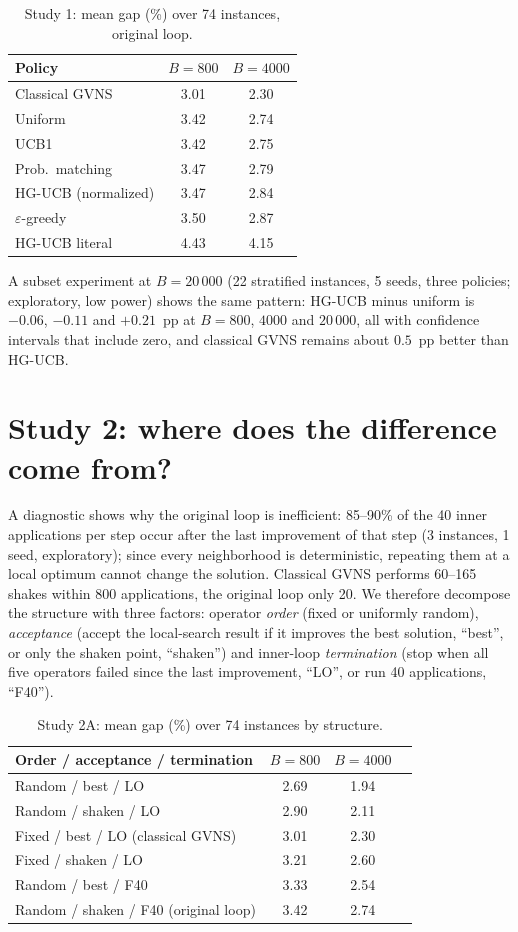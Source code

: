 \documentclass[conference]{IEEEtran}
\begin{document}
\begin{table}[t]
\caption{Study 1: mean gap (\%) over 74 instances, original loop.}\label{tab:s1}
\centering
\begin{tabular}{lcc}
\toprule
Policy & $B=800$ & $B=4000$ \\
\midrule
Classical GVNS & 3.01 & 2.30 \\
Uniform & 3.42 & 2.74 \\
UCB1 & 3.42 & 2.75 \\
Prob.\ matching & 3.47 & 2.79 \\
HG-UCB (normalized) & 3.47 & 2.84 \\
$\varepsilon$-greedy & 3.50 & 2.87 \\
HG-UCB literal & 4.43 & 4.15 \\
\bottomrule
\end{tabular}
\end{table}

A subset experiment at $B=20\,000$ (22 stratified instances, 5 seeds, three policies; exploratory, low power) shows the same pattern: HG-UCB minus uniform is $-0.06$, $-0.11$ and $+0.21$~pp at $B=800$, $4000$ and $20\,000$, all with confidence intervals that include zero, and classical GVNS remains about $0.5$~pp better than HG-UCB.

\section{Study 2: where does the difference come from?}
A diagnostic shows why the original loop is inefficient: 85--90\% of the 40 inner applications per step occur after the last improvement of that step (3 instances, 1 seed, exploratory); since every neighborhood is deterministic, repeating them at a local optimum cannot change the solution. Classical GVNS performs 60--165 shakes within 800 applications, the original loop only 20. We therefore decompose the structure with three factors: operator \emph{order} (fixed or uniformly random), \emph{acceptance} (accept the local-search result if it improves the best solution, ``best'', or only the shaken point, ``shaken'') and inner-loop \emph{termination} (stop when all five operators failed since the last improvement, ``LO'', or run 40 applications, ``F40'').

\begin{table}[t]
\caption{Study 2A: mean gap (\%) over 74 instances by structure.}\label{tab:s2a}
\centering
\begin{tabular}{lccc}
\toprule
Order / acceptance / termination & $B=800$ & $B=4000$ \\
\midrule
Random / best / LO & 2.69 & 1.94 \\
Random / shaken / LO & 2.90 & 2.11 \\
Fixed / best / LO (classical GVNS) & 3.01 & 2.30 \\
Fixed / shaken / LO & 3.21 & 2.60 \\
Random / best / F40 & 3.33 & 2.54 \\
Random / shaken / F40 (original loop) & 3.42 & 2.74 \\
\bottomrule
\end{tabular}
\end{table}
\end{document}
